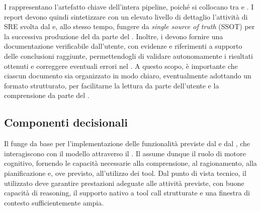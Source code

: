 
I \report{} rappresentano l'artefatto chiave dell'intera pipeline, poiché si collocano tra \sreagent{} e \codeagent{}. I report devono quindi sintetizzare con un elevato livello di dettaglio l'attività di SRE svolta dal \sreagent{} e, allo stesso tempo, fungere da \emph{single source of truth} (SSOT) per la successiva produzione del \capture{} da parte del \codeagent{}. Inoltre, i \report{} devono fornire una documentazione verificabile dall'utente, con evidenze e riferimenti a supporto delle conclusioni raggiunte, permettendogli di validare autonomamente i risultati ottenuti e correggere eventuali errori nel \capture{}. A questo scopo, è importante che ciascun documento sia organizzato in modo chiaro, eventualmente adottando un formato strutturato, per facilitarne la lettura da parte dell'utente e la comprensione da parte del \llm{}. 



\subsection{Componenti decisionali} %

Il \llm{} funge da base per l'implementazione delle funzionalità previste dal \sreagent{} e dal \codeagent{}, che interagiscono con il modello attraverso il \llmclient{}. Il \llm{} assume dunque il ruolo di motore cognitivo, fornendo le capacità necessarie alla comprensione, al ragionamento, alla pianificazione e, ove previsto, all'utilizzo dei tool. Dal punto di vista tecnico, il \llm{} utilizzato deve garantire prestazioni adeguate alle attività previste, con buone capacità di reasoning, il supporto nativo a tool call strutturate e una finestra di contesto sufficientemente ampia.

